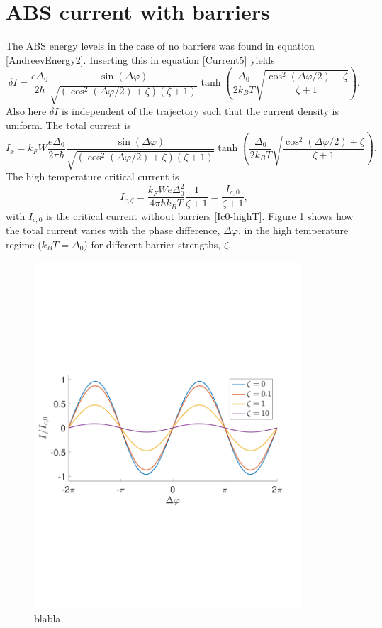 \section{ABS current with barriers}
\label{sec:CurrentWithBarriers}
The ABS energy levels in the case of no barriers was found in equation \eqref{AndreevEnergy2}. Inserting this in equation \eqref{Current5} yields
\begin{equation}
\delta I = \frac{e \Delta_0}{2 \hbar}\frac{\sin(\Delta \varphi)}{\sqrt{(\cos^2(\Delta \varphi /2 )+ \zeta)(\zeta + 1)}}\tanh\left(\frac{\Delta_0}{2k_BT}\sqrt{\frac{\cos^2(\Delta \varphi/2) + \zeta}{\zeta + 1}}\right).
\end{equation}
Also here $\delta I $ is independent of the trajectory such that the current density is uniform. The total current is
\begin{equation}
I_x = k_FW \frac{e \Delta_0}{2 \pi \hbar}\frac{\sin(\Delta \varphi)}{\sqrt{(\cos^2(\Delta \varphi /2 )+ \zeta)(\zeta + 1)}}\tanh\left(\frac{\Delta_0}{2k_BT}\sqrt{\frac{\cos^2(\Delta \varphi/2) + \zeta}{\zeta + 1}}\right).
\end{equation}
The high temperature critical current is
\begin{equation}
I_{c,\zeta} = \frac{k_F W e\Delta_0^2}{4\pi \hbar k_BT}\frac{1}{\zeta + 1} = \frac{I_{c,0}}{\zeta+1},
\end{equation}
with $I_{c,0}$ is the critical current without barriers \eqref{Ic0-highT}. Figure \ref{fig:CurrentWithoutField} shows how the total current varies with the phase difference, $\Delta \varphi$, in the high temperature regime ($k_BT = \Delta_0$) for different barrier strengths, $\zeta$.
\begin{figure}[hhh]
\centering
\includegraphics[width=10cm,clip=true,trim=0cm 8cm 1.5cm 9cm]{fig/WithoutField}
\caption{blabla}
\label{fig:CurrentWithoutField}
\end{figure}

